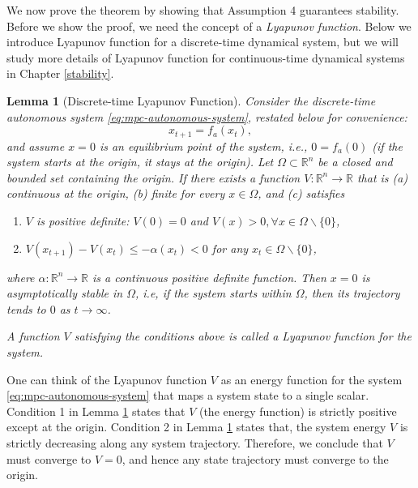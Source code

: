 \documentclass[
]{book}
\newtheorem{lemma}{Lemma}[chapter]
\theoremstyle{definition}
\theoremstyle{definition}
\theoremstyle{definition}
\theoremstyle{definition}
\theoremstyle{remark}
\begin{document}
We now prove the theorem by showing that Assumption 4 guarantees stability. Before we show the proof, we need the concept of a \emph{Lyapunov function}. Below we introduce Lyapunov function for a discrete-time dynamical system, but we will study more details of Lyapunov function for continuous-time dynamical systems in Chapter \ref{stability}.

\begin{lemma}[Discrete-time Lyapunov Function]
\protect\hypertarget{lem:lyapunov-stability-discrete-time}{}\label{lem:lyapunov-stability-discrete-time}Consider the discrete-time autonomous system \eqref{eq:mpc-autonomous-system}, restated below for convenience:
\[
x_{t+1} = f_a(x_t),
\]
and assume \(x=0\) is an equilibrium point of the system, i.e., \(0 = f_a (0)\) (if the system starts at the origin, it stays at the origin). Let \(\Omega \subset \mathbb{R}^n\) be a closed and bounded set containing the origin.
If there exists a function \(V: \mathbb{R}^n \rightarrow \mathbb{R}\) that is (a) continuous at the origin, (b) finite for every \(x \in \Omega\), and (c) satisfies

\begin{enumerate}
\def\labelenumi{\arabic{enumi}.}
\item
  \(V\) is positive definite: \(V(0) = 0\) and \(V(x) > 0,\forall x \in \Omega \backslash \{ 0\}\),
\item
  \(V(x_{t+1}) - V(x_t) \leq - \alpha(x_t) < 0\) for any \(x_t \in \Omega \backslash \{ 0\}\),
\end{enumerate}

where \(\alpha: \mathbb{R}^n \rightarrow \mathbb{R}\) is a continuous positive definite function. Then \(x=0\) is asymptotically stable in \(\Omega\), i.e, if the system starts within \(\Omega\), then its trajectory tends to \(0\) as \(t \rightarrow \infty\).

A function \(V\) satisfying the conditions above is called a Lyapunov function for the system.
\end{lemma}

One can think of the Lyapunov function \(V\) as an energy function for the system \eqref{eq:mpc-autonomous-system} that maps a system state to a single scalar. Condition 1 in Lemma \ref{lem:lyapunov-stability-discrete-time} states that \(V\) (the energy function) is strictly positive except at the origin. Condition 2 in Lemma \ref{lem:lyapunov-stability-discrete-time} states that, the system energy \(V\) is strictly decreasing along any system trajectory. Therefore, we conclude that \(V\) must converge to \(V=0\), and hence any state trajectory must converge to the origin.
\end{document}
